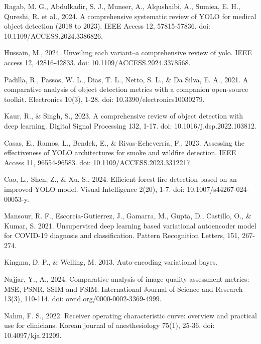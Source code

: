 \begin{thebibliography}{9}
  Ragab, M. G., Abdulkadir, S. J., Muneer, A., Alqushaibi, A.,
  Sumiea, E. H., Qureshi, R. et al., 2024. A
  comprehensive systematic review of YOLO for medical object
  detection (2018 to 2023). IEEE Access 12, 57815-57836. doi:
  10.1109/ACCESS.2024.3386826.

  Hussain, M., 2024. Unveiling each variant–a comprehensive review of
  yolo. IEEE access 12, 42816-42833. doi: 10.1109/ACCESS.2024.3378568.

  Padilla, R., Passos, W. L., Dias, T. L., Netto, S. L., \& Da Silva,
  E. A., 2021. A comparative analysis of object detection metrics
  with a companion open-source toolkit. Electronics 10(3), 1-28. doi:
  10.3390/electronics10030279.

  Kaur, R., \& Singh, S., 2023. A comprehensive review of object
  detection with deep learning. Digital Signal Processing 132, 1-17.
  doi: 10.1016/j.dsp.2022.103812.

  Casas, E., Ramos, L., Bendek, E., \& Rivas-Echeverría, F., 2023.
  Assessing the effectiveness of YOLO architectures for smoke and
  wildfire detection. IEEE Access 11, 96554-96583. doi:
  10.1109/ACCESS.2023.3312217.

  Cao, L., Shen, Z., \& Xu, S., 2024. Efficient forest fire detection
  based on an improved YOLO model. Visual Intelligence 2(20), 1-7.
  doi: 10.1007/s44267-024-00053-y.

  Mansour, R. F., Escorcia-Gutierrez, J., Gamarra, M., Gupta, D.,
  Castillo, O., \& Kumar, S. 2021. Unsupervised deep learning based
  variational autoencoder model for COVID-19 diagnosis and
  classification. Pattern Recognition Letters, 151, 267-274.

  Kingma, D. P., \& Welling, M. 2013. Auto-encoding
  variational bayes.

  Najjar, Y., A., 2024. Comparative analysis of image quality
  assessment metrics: MSE, PSNR, SSIM and FSIM. International Journal
  of Science and Research 13(3), 110-114. doi: orcid.org/0000-0002-3369-4999.

  Nahm, F. S., 2022. Receiver operating characteristic curve:
  overview and practical use for clinicians. Korean journal of
  anesthesiology 75(1), 25-36. doi: 10.4097/kja.21209.

\end{thebibliography}
